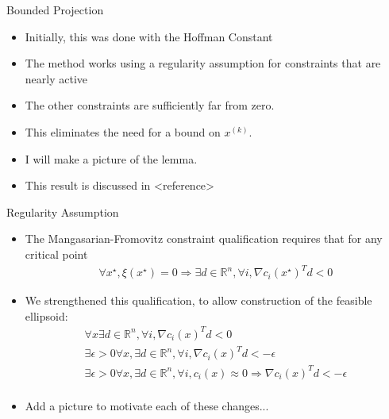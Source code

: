\documentclass{beamer}
\newcommand{\Rn}{\mathbb R ^ {n}}
\newcommand{\xk}{{{x}^{(k)}}}
\begin{document}
\begin{frame}{Bounded Projection}
\begin{itemize}
\item Initially, this was done with the Hoffman Constant
\item The method works using a regularity assumption for constraints that are nearly active
\item The other constraints are sufficiently far from zero.
\item This eliminates the need for a bound on $\xk$.
\color{red}
\item I will make a picture of the lemma.
\color{black}
\item This result is discussed in <reference>
\end{itemize}
\end{frame}


\begin{frame}{Regularity Assumption}
\begin{itemize}
\item The Mangasarian-Fromovitz constraint qualification requires that for any critical point 
\begin{align*}
\forall x^{\star}, \xi\left(x^{\star}\right) = 0 
\Longrightarrow \exists d \in \Rn, \forall i, \nabla c_i\left(x^{\star}\right)^T d < 0 
\end{align*}
\item We strengthened this qualification, to allow construction of the feasible ellipsoid:
\begin{align*}
\forall x \exists d \in \Rn, \forall i, \nabla c_i\left(x\right)^T d < 0 \\
\exists \epsilon>0 \forall x, \exists d \in \Rn, \forall i, \nabla c_i\left(x\right)^T d < -\epsilon \\
\exists \epsilon>0 \forall x,\exists d\in \Rn, \forall i, c_i\left(x\right) \approx 0
\Longrightarrow \nabla c_i\left(x\right)^T d < -\epsilon \\
\end{align*}
\color{red}
\item Add a picture to motivate each of these changes...
\color{black}
\end{itemize}
\end{frame}
\end{document}
